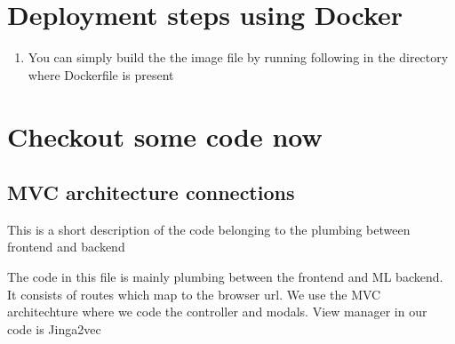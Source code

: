 \documentclass[letterpaper,10pt,english]{sphinxmanual}
\begin{document}
\chapter{Deployment steps using Docker}
\label{\detokenize{index:deployment-steps-using-docker}}\begin{enumerate}
%
\item {} 
You can simply build the the image file by running following in the directory where Dockerfile is present

\begin{sphinxVerbatim}[commandchars=\\\{\}]
    
\end{sphinxVerbatim}

\begin{sphinxVerbatim}[commandchars=\\\{\}]
      
\end{sphinxVerbatim}

\end{enumerate}


\chapter{Checkout some code now}
\label{\detokenize{index:checkout-some-code-now}}

\section{MVC architecture connections}
\label{\detokenize{main:mvc-architecture-connections}}\label{\detokenize{main::doc}}
This is a short description of the code belonging to the plumbing between frontend and backend

The code in this file is mainly plumbing between the frontend and ML backend. It consists of routes which map to the browser url. We use the MVC architechture where we code the controller and modals. View manager in our code is Jinga2vec

\label{\detokenize{main:module-main}}
\end{document}
